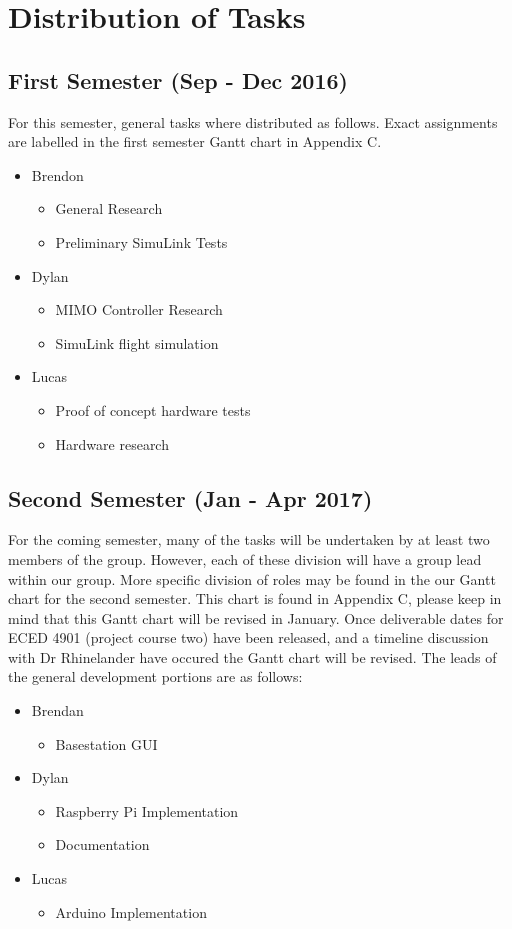 \section{Distribution of Tasks}
\subsection{First Semester (Sep - Dec 2016)}
For this semester, general tasks where distributed as follows.  Exact assignments are labelled in the first semester Gantt chart in Appendix C.

\begin{itemize}
	\item Brendon \begin{itemize}
		\item General Research
		\item Preliminary SimuLink Tests
	\end{itemize}
	\item Dylan \begin{itemize}
		\item MIMO Controller Research
		\item SimuLink flight simulation
	\end{itemize}
	\item Lucas \begin{itemize}
		\item Proof of concept hardware tests
		\item Hardware research
	\end{itemize}
\end{itemize}

\subsection{Second Semester (Jan - Apr 2017)}

For the coming semester, many of the tasks will be undertaken by at least two members of the group.  However, each of these division will have a group lead within our group.  More specific division of roles may be found in the our Gantt chart for the second semester.  This chart is found in Appendix C, please keep in mind that this Gantt chart will be revised in January.  Once deliverable dates for ECED 4901 (project course two) have been released, and a timeline discussion with Dr Rhinelander have occured the Gantt chart will be revised.  The leads of the general development portions are as follows:

\begin{itemize}
	\item Brendan \begin{itemize}
		\item Basestation GUI
	\end{itemize}
	\item Dylan \begin{itemize}
		\item Raspberry Pi Implementation
		\item Documentation
	\end{itemize}
	\item Lucas \begin{itemize}
		\item Arduino Implementation
	\end{itemize}
\end{itemize}
